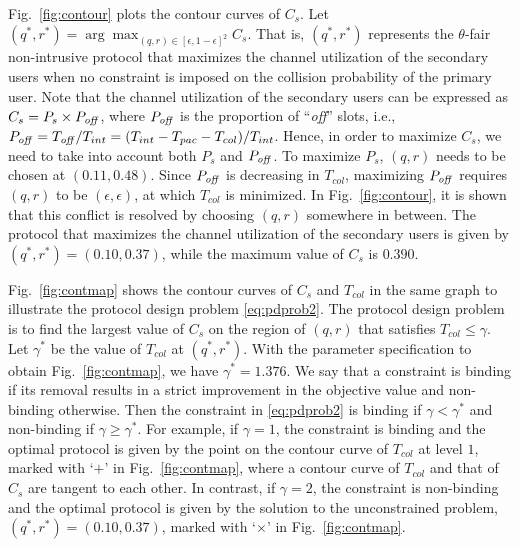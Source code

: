 \documentclass[12pt,draftclsnofoot,onecolumn]{IEEEtran}
\begin{document}
Fig.~\ref{fig:contour} plots the contour curves of $C_s$.
Let $(q^*, r^*) = \arg \max_{(q,r) \in [\epsilon,1-\epsilon]^2} C_s$. That is, $(q^*, r^*)$ represents
the $\theta$-fair non-intrusive protocol that maximizes the channel utilization of the secondary users when no constraint
is imposed on the collision probability of the primary user.
Note that the channel utilization of the secondary users can be expressed as
$C_s = P_s \times P_{\textrm{\emph{off}}}$, where $P_{\textrm{\emph{off}}}$ is the proportion of ``\emph{off}'' slots, i.e.,
$P_{\textrm{\emph{off}}} = T_{\textrm{\emph{off}}}/T_{int} = (T_{int} - T_{pac} - T_{col})/T_{int}$.
Hence, in order to maximize $C_s$, we need to take into account both $P_s$ and $P_{\textrm{\emph{off}}}$.
To maximize $P_s$, $(q,r)$ needs to be chosen at $(0.11, 0.48)$. Since
$P_{\textrm{\emph{off}}}$ is decreasing in $T_{col}$, maximizing $P_{\textrm{\emph{off}}}$
requires $(q,r)$ to be $(\epsilon,\epsilon)$, at which $T_{col}$ is minimized. In Fig.~\ref{fig:contour},
it is shown that this conflict is resolved by choosing $(q,r)$ somewhere in between.
The protocol that maximizes the channel utilization of the secondary users is given by
$(q^*,r^*) = (0.10, 0.37)$, while the maximum value of $C_s$ is $0.390$.

Fig.~\ref{fig:contmap} shows the contour curves of $C_s$ and $T_{col}$ in
the same graph to illustrate the protocol design problem \eqref{eq:pdprob2}.
The protocol design problem is to find
the largest value of $C_s$ on the region of $(q,r)$ that satisfies $T_{col} \leq \gamma$.
Let $\gamma^*$ be the value of $T_{col}$ at $(q^*, r^*)$.
With the parameter specification to obtain Fig.~\ref{fig:contmap}, we have $\gamma^* = 1.376$.
We say that a constraint is binding if its removal results in a strict improvement
in the objective value and non-binding otherwise. Then the constraint in \eqref{eq:pdprob2}
is binding if $\gamma < \gamma^*$ and non-binding if $\gamma \geq \gamma^*$.
For example, if $\gamma = 1$, the constraint is binding and the optimal protocol
is given by the point on the contour curve of $T_{col}$ at level $1$, marked
with `$+$' in Fig.~\ref{fig:contmap}, where
a contour curve of $T_{col}$ and that of $C_s$ are tangent to each other.
In contrast, if $\gamma = 2$, the constraint is non-binding and
the optimal protocol is given by the solution to the unconstrained problem, $(q^*,r^*) = (0.10, 0.37)$, marked
with `$\times$' in Fig.~\ref{fig:contmap}.
\end{document}
